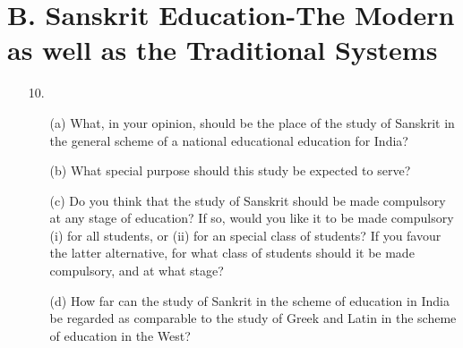 {\section*{{\rm\bfseries B. Sanskrit Education-The Modern as well as the Traditional Systems}}}

{\rm 
\begin{itemize}
\item[10.] \begin{itemize}
           \item[(a)] What, in your opinion, should be the place of the study of Sanskrit in the general scheme of a national educational education for India?
           
           \item[(b)] What special purpose should this study be expected to serve?
           
           \item[(c)] Do you think that the study of Sanskrit should be made compulsory at any stage of education? If so, would you like it to be made compulsory (i) for all students, or (ii) for an special class of students? If you favour the latter alternative, for what class of students should it be made compulsory, and at what stage?
           
           \item[(d)] How far can the study of Sankrit in the scheme of education in India be regarded as comparable to the study of Greek and Latin in the scheme of education in the West?
           \end{itemize}
\end{itemize}
}

